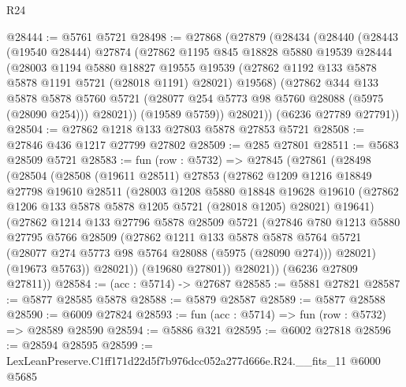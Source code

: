 \begin{lexlean}{R24}
\begin{coremodule}
@28444 := @5761 @5721
@28498 := @27868
    (@27879
      (@28434
        (@28440
          (@28443
            (@19540 @28444)
            @27874
            (@27862
              @1195
              @845
              @18828
              @5880
              @19539
              @28444
              (@28003
                @1194
                @5880
                @18827
                @19555
                @19539
                (@27862 @1192 @133 @5878 @5878 @1191 @5721 (@28018 @1191) @28021)
                @19568)
              (@27862
                @344
                @133
                @5878
                @5878
                @5760
                @5721
                (@28077 @254 @5773 @98 @5760 @28088 (@5975 (@28090 @254)))
                @28021))
            (@19589 @5759))
          @28021))
      (@6236 @27789 @27791))
@28504 := @27862 @1218 @133 @27803 @5878 @27853 @5721
@28508 := @27846 @436 @1217 @27799 @27802
@28509 := @285 @27801
@28511 := @5683 @28509 @5721
@28583 := fun (row : @5732) =>
  @27845
    (@27861
      (@28498
        (@28504
          (@28508
            (@19611 @28511)
            @27853
            (@27862
              @1209
              @1216
              @18849
              @27798
              @19610
              @28511
              (@28003
                @1208
                @5880
                @18848
                @19628
                @19610
                (@27862 @1206 @133 @5878 @5878 @1205 @5721 (@28018 @1205) @28021)
                @19641)
              (@27862
                @1214
                @133
                @27796
                @5878
                @28509
                @5721
                (@27846
                  @780
                  @1213
                  @5880
                  @27795
                  @5766
                  @28509
                  (@27862
                    @1211
                    @133
                    @5878
                    @5878
                    @5764
                    @5721
                    (@28077 @274 @5773 @98 @5764 @28088 (@5975 (@28090 @274)))
                    @28021)
                  (@19673 @5763))
                @28021))
            (@19680 @27801))
          @28021))
      (@6236 @27809 @27811))
@28584 := (acc : @5714) -> @27687
@28585 := @5881 @27821
@28587 := @5877 @28585 @5878
@28588 := @5879 @28587
@28589 := @5877 @28588
@28590 := @6009 @27824
@28593 := fun (acc : @5714) => fun (row : @5732) => @28589 @28590
@28594 := @5886 @321
@28595 := @6002 @27818
@28596 := @28594 @28595
@28599 := LexLeanPreserve.C1ff171d22d5f7b976dcc052a277d666e.R24.__fits_11 @6000 @5685

\end{coremodule}
\end{lexlean}
